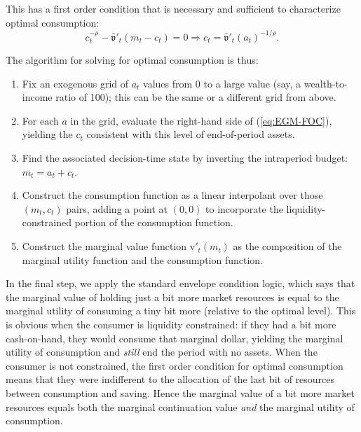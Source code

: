 \documentclass[12pt,letterpaper, fleqn]{article}
\newcommand{\CRRA}{\rho}
\newcommand{\vFunc}{\mathrm{v}}
\newcommand{\cNrm}{c}
\newcommand{\mNrm}{m}
\newcommand{\aNrm}{a}
\begin{document}
This has a first order condition that is necessary and sufficient to characterize optimal consumption:
\begin{equation}
\label{eq:EGM-FOC}
\cNrm_t^{-\CRRA} - \bar{\mathfrak{v}}'_t(\mNrm_t - \cNrm_t) = 0 \Longrightarrow \cNrm_t = \bar{\mathfrak{v}}'_t(\aNrm_t)^{-1/\CRRA}.
\end{equation}

The algorithm for solving for optimal consumption is thus:

\begin{enumerate}
\item Fix an exogenous grid of $\aNrm_t$ values from 0 to a large value (say, a wealth-to-income ratio of 100); this can be the same or a different grid from above.


\item For each $\aNrm$ in the grid, evaluate the right-hand side of (\ref{eq:EGM-FOC}), yielding the $\cNrm_t$ consistent with this level of end-of-period assets.


\item Find the associated decision-time state by inverting the intraperiod budget: $\mNrm_t = \aNrm_t + \cNrm_t$.


\item Construct the consumption function as a linear interpolant over those $(\mNrm_t, \cNrm_t)$ pairs, adding a point at $(0,0)$ to incorporate the liquidity-constrained portion of the consumption function.


\item Construct the marginal value function $\vFunc'_t(\mNrm_t)$ as the composition of the marginal utility function and the consumption function.
\end{enumerate}

In the final step, we apply the standard envelope condition logic, which says that the marginal value of holding just a bit more market resources is equal to the marginal utility of consuming a tiny bit more (relative to the optimal level). This is obvious when the consumer is liquidity constrained: if they had a bit more cash-on-hand, they would consume that marginal dollar, yielding the marginal utility of consumption and \textit{still} end the period with no assets. When the consumer is not constrained, the first order condition for optimal consumption means that they were indifferent to the allocation of the last bit of resources between consumption and saving. Hence the marginal value of a bit more market resources equals both the marginal continuation value \textit{and} the marginal utility of consumption.
\end{document}
